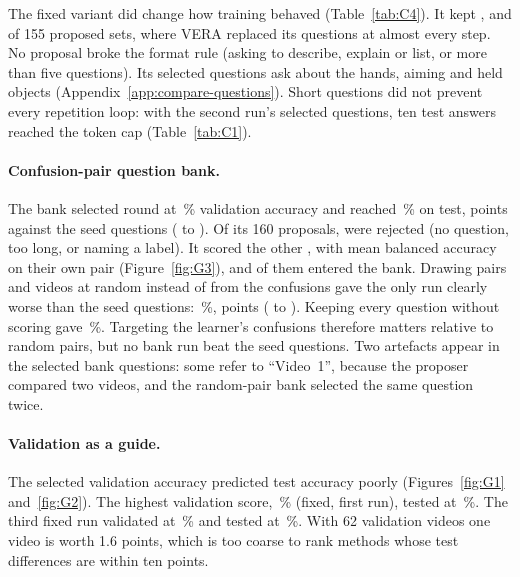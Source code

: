 The fixed variant did change how training behaved (Table~\ref{tab:C4}). It kept ,  and  of 155 proposed sets, where VERA replaced its questions at almost every step. No proposal broke the format rule (asking to describe, explain or list, or more than five questions). Its selected questions ask about the hands, aiming and held objects (Appendix~\ref{app:compare-questions}). Short questions did not prevent every repetition loop: with the second run's selected questions, ten test answers reached the token cap (Table~\ref{tab:C1}).

\paragraph{Confusion-pair question bank.} The bank selected round  at \,\% validation accuracy and reached \,\% on test,  points against the seed questions ( to ). Of its 160 proposals,  were rejected (no question, too long, or naming a label). It scored the other , with mean balanced accuracy  on their own pair (Figure~\ref{fig:G3}), and  of them entered the bank. Drawing pairs and videos at random instead of from the confusions gave the only run clearly worse than the seed questions: \,\%,  points ( to ). Keeping every question without scoring gave \,\%. Targeting the learner's confusions therefore matters relative to random pairs, but no bank run beat the seed questions. Two artefacts appear in the selected bank questions: some refer to ``Video~1'', because the proposer compared two videos, and the random-pair bank selected the same question twice.

\paragraph{Validation as a guide.} The selected validation accuracy predicted test accuracy poorly (Figures~\ref{fig:G1} and~\ref{fig:G2}). The highest validation score, \,\% (fixed, first run), tested at \,\%. The third fixed run validated at \,\% and tested at \,\%. With 62 validation videos one video is worth 1.6 points, which is too coarse to rank methods whose test differences are within ten points.

